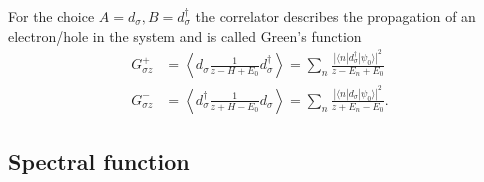 For the choice $A=d_\sigma, B=d_\sigma^\dag$ the correlator describes
the propagation of an electron/hole in the system and is called Green's function
\begin{subequations}
    \begin{align}
        G^+_{\sigma z}
         & =
        \left\langle d_\sigma \frac{1}{z - H + E_0} d_\sigma^\dag\right\rangle
        =
        \sum_n \frac{|\langle n | d_\sigma^\dag | \psi_0\rangle|^2}{z - E_n + E_0}
        \\
        G^-_{\sigma z}
         & =
        \left\langle d_\sigma^\dag \frac{1}{z + H - E_0} d_\sigma\right\rangle
        =
        \sum_n \frac{|\langle n | d_\sigma | \psi_0\rangle|^2}{z + E_n - E_0}.
    \end{align}
\end{subequations}

\subsection{Spectral function}

